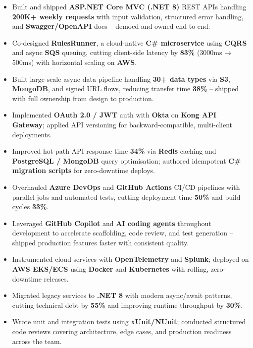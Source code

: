 \documentclass[letterpaper,10pt]{article}
\begin{document}
\begin{itemize}[leftmargin=*]
    \item Built and shipped \textbf{ASP.NET Core MVC (.NET 8)} REST APIs handling \textbf{200K+ weekly requests} with input validation, structured error handling, and \textbf{Swagger/OpenAPI} docs -- demoed and owned end-to-end.
    \item Co-designed \textbf{RulesRunner}, a cloud-native \textbf{C\# microservice} using \textbf{CQRS} and async \textbf{SQS} queuing, cutting client-side latency by \textbf{83\%} (3000ms → 500ms) with horizontal scaling on \textbf{AWS}.
    \item Built large-scale async data pipeline handling \textbf{30+ data types} via \textbf{S3}, \textbf{MongoDB}, and signed URL flows, reducing transfer time \textbf{38\%} -- shipped with full ownership from design to production.
    \item Implemented \textbf{OAuth 2.0 / JWT} auth with \textbf{Okta} on \textbf{Kong API Gateway}; applied API versioning for backward-compatible, multi-client deployments.
    \item Improved hot-path API response time \textbf{34\%} via \textbf{Redis} caching and \textbf{PostgreSQL / MongoDB} query optimisation; authored idempotent \textbf{C\# migration scripts} for zero-downtime deploys.
    \item Overhauled \textbf{Azure DevOps} and \textbf{GitHub Actions} CI/CD pipelines with parallel jobs and automated tests, cutting deployment time \textbf{50\%} and build cycles \textbf{33\%}.
    \item Leveraged \textbf{GitHub Copilot} and \textbf{AI coding agents} throughout development to accelerate scaffolding, code review, and test generation -- shipped production features faster with consistent quality.
    \item Instrumented cloud services with \textbf{OpenTelemetry} and \textbf{Splunk}; deployed on \textbf{AWS EKS/ECS} using \textbf{Docker} and \textbf{Kubernetes} with rolling, zero-downtime releases.
    \item Migrated legacy services to \textbf{.NET 8} with modern async/await patterns, cutting technical debt by \textbf{55\%} and improving runtime throughput by \textbf{30\%}.
    \item Wrote unit and integration tests using \textbf{xUnit/NUnit}; conducted structured code reviews covering architecture, edge cases, and production readiness across the team.
\end{itemize}
\end{document}
